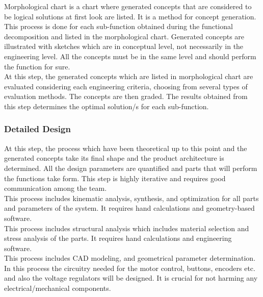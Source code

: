 \documentclass[12pt]{report}
\begin{document}
Morphological chart is a chart where generated concepts that are considered to be logical solutions at first look are listed. It is a method for concept generation. This process is done for each sub-function obtained during the functional decomposition and listed in the morphological chart. Generated concepts are illustrated with sketches which are in conceptual level, not necessarily in the engineering level. All the concepts must be in the same level and should perform the function for sure. \\

At this step, the generated concepts which are listed in morphological chart are evaluated considering each engineering criteria, choosing from several types of evaluation methods. The concepts are then graded. The results obtained from this step determines the optimal solution/s for each sub-function.

\subsubsection{Detailed Design}
At this step, the process which have been theoretical up to this point and the generated concepts take its final shape and the product architecture is determined. All the design parameters are quantified and parts that will perform the functions take form. This step is highly iterative and requires good communication among the team. \\

This process includes kinematic analysis, synthesis, and optimization for all parts and parameters of the system. It requires hand calculations and geometry-based software. \\

 This process includes structural analysis which includes material selection and stress analysis of the parts. It requires hand calculations and engineering software. \\
 
This process includes CAD modeling, and geometrical parameter determination. \\

In this process the circuitry needed for the motor control, buttons, encoders etc. and also the voltage regulators will be designed. It is crucial for not harming any electrical/mechanical components.
\end{document}
